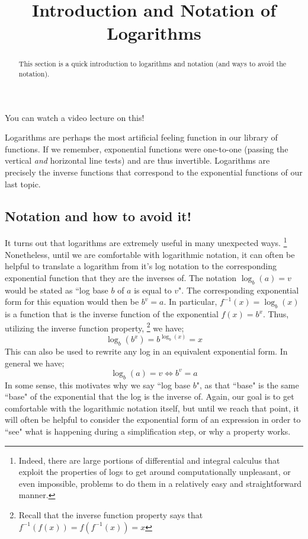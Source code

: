 \documentclass{ximera}
\title{Introduction and Notation of Logarithms}
\begin{document}
\begin{abstract}
    This section is a quick introduction to logarithms and notation (and ways to avoid the notation).
\end{abstract}
\maketitle

You can watch a video lecture on this!


Logarithms are perhaps the most artificial feeling function in our library of functions. If we remember, exponential functions were one-to-one (passing the vertical \textit{and} horizontal line tests) and are thus invertible. Logarithms are precisely the inverse functions that correspond to the exponential functions of our last topic.

\subsection*{Notation and how to avoid it!}

    It turns out that logarithms are extremely useful in many unexpected ways.%
    \footnote{Indeed, there are large portions of differential and integral calculus that exploit the properties of logs to get around computationally unpleasant, or even impossible, problems to do them in a relatively easy and straightforward manner.}
    Nonetheless, until we are comfortable with logarithmic notation, it can often be helpful to translate a logarithm from it's log notation to the corresponding exponential function that they are the inverses of. The notation $\log_b(a) = v$ would be stated as ``log base $b$ of $a$ is equal to $v$". The corresponding exponential form for this equation would then be $b^v = a$. In particular, $f^{-1}(x) = \log_b(x)$ is a function that is the inverse function of the exponential $f(x)=b^x$. Thus, utilizing the inverse function property,%
    \footnote{Recall that the inverse function property says that $f^{-1}(f(x)) = f(f^{-1}(x)) = x$}
    we have;
    \[
        \log_b(b^x) = b^{\log_b(x)} = x
    \]
    This can also be used to rewrite any log in an equivalent exponential form. In general we have;
    \[
        \log_b(a)=v \iff b^v = a
    \]
    In some sense, this motivates why we say ``log base $b$", as that ``base" is the same ``base" of the exponential that the log is the inverse of. Again, our goal is to get comfortable with the logarithmic notation itself, but until we reach that point, it will often be helpful to consider the exponential form of an expression in order to ``see" what is happening during a simplification step, or why a property works.

%
%
%
%
%
\end{document}
